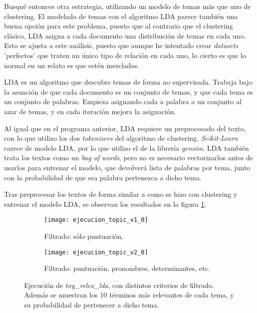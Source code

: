 \documentclass{pre-tfg}
\begin{document}
Busqué entonces otra estrategia, utilizando un modelo de temas más que uno de clustering. El modelado de temas con el algoritmo LDA parece también una buena opción para este problema, puesto que al contrario que el clustering clásico, LDA asigna a cada documento una distribución de temas en cada uno. Esto se ajusta a este análisis, puesto que aunque he intentado crear \textit{datasets} 'perfectos' que traten un único tipo de relación en cada uno, lo cierto es que lo normal en un relato es que estén mezcladas.

LDA es un algoritmo que descubre temas de forma no supervisada. Trabaja bajo la asunción de que cada documento es un conjunto de temas, y que cada tema es un conjunto de palabras. Empieza asignando cada a palabra a un conjunto al azar de temas, y en cada iteración mejora la asignación. 

Al igual que en el programa anterior, LDA requiere un preprocesado del texto, con lo que utilizo los dos \textit{tokenizers} del algoritmo de clustering. \textit{Scikit-Learn} carece de modelo LDA, por lo que utilizo el de la librería \textit{gensim}. LDA también trata los textos como un \textit{bag of words}, pero no es necesario vectorizarlos antes de usarlos para entrenar el modelo, que devolverá  lista de palabras por tema, junto con la probabilidad de que esa palabra pertenezca a dicho tema.

Tras preprocesar los textos de forma similar a como se hizo con clustering y entrenar el modelo LDA, se observan los resultados en la figura \ref{fig:topicresult1}.

\begin{figure}
	\begin{subfigure}{\textwidth}
		\hspace{-1cm}
		\texttt{[image: ejecucion\_topic\_v1\_0]}
		\caption{Filtrado: sólo puntuación.}
		\label{fig:topicresult1}
	
	\end{subfigure}
	\begin{subfigure}{\textwidth}
		\hspace{-1cm}
		\texttt{[image: ejecucion\_topic\_v2\_0]}
		\caption{Filtrado: puntuación, pronombres, determinantes, etc.}
		\label{fig:topicresult2}
	\end{subfigure}

	\caption{Ejecución de \textit{toy\_relex\_lda}, con distintos criterios de filtrado. Además se muestran los 10 términos más relevantes de cada tema, y su probabilidad de pertenecer a dicho tema.}

\end{figure}
\end{document}
